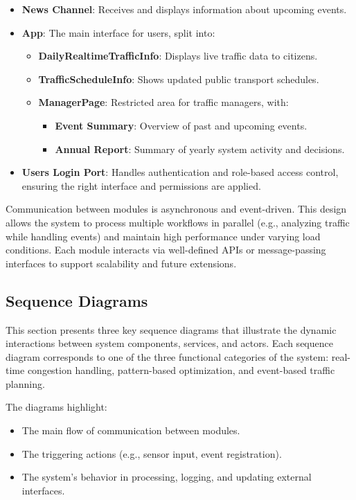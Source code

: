 \begin{itemize}
    \item \textbf{News Channel}: Receives and displays information about upcoming events.

    \item \textbf{App}: The main interface for users, split into:
    \begin{itemize}
        \item \textbf{DailyRealtimeTrafficInfo}: Displays live traffic data to citizens.
        \item \textbf{TrafficScheduleInfo}: Shows updated public transport schedules.
        \item \textbf{ManagerPage}: Restricted area for traffic managers, with:
        \begin{itemize}
            \item \textbf{Event Summary}: Overview of past and upcoming events.
            \item \textbf{Annual Report}: Summary of yearly system activity and decisions.
        \end{itemize}
    \end{itemize}

    \item \textbf{Users Login Port}: Handles authentication and role-based access control, ensuring the right interface and permissions are applied.
\end{itemize}

Communication between modules is asynchronous and event-driven. This design allows the system to process multiple workflows in parallel (e.g., analyzing traffic while handling events) and maintain high performance under varying load conditions. Each module interacts via well-defined APIs or message-passing interfaces to support scalability and future extensions.

\newpage
\subsection{Sequence Diagrams}

This section presents three key sequence diagrams that illustrate the dynamic interactions between system components, services, and actors. Each sequence diagram corresponds to one of the three functional categories of the system: real-time congestion handling, pattern-based optimization, and event-based traffic planning.

The diagrams highlight:
\begin{itemize}
    \item The main flow of communication between modules.
    \item The triggering actions (e.g., sensor input, event registration).
    \item The system's behavior in processing, logging, and updating external interfaces.
\end{itemize}


